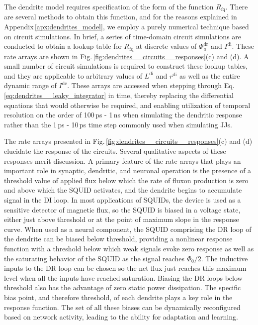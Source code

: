 \documentclass[twocolumn]{article}
\begin{document}
The dendrite model requires specification of the form of the function $R_{\mathrm{fq}}$. There are several methods to obtain this function, and for the reasons explained in Appendix\,\ref{apx:dendrites_model}, we employ a purely numerical technique based on circuit simulations. In brief, a series of time-domain circuit simulations are conducted to obtain a lookup table for $R_{\mathrm{fq}}$ at discrete values of $\Phi^{\mathrm{dr}}_a$ and $I^{\mathrm{di}}$. These rate arrays are shown in Fig.\,\ref{fig:dendrites__circuits__responses}(c) and (d). A small number of circuit simulations is required to construct these lookup tables, and they are applicable to arbitrary values of $L^{\mathrm{di}}$ and $r^{\mathrm{di}}$ as well as the entire dynamic range of $I^{\mathrm{de}}$. These arrays are accessed when stepping through Eq.\,\ref{eq:dendrites__leaky_integrator} in time, thereby replacing the differential equations that would otherwise be required, and enabling utilization of temporal resolution on the order of 100\,ps - 1\,ns when simulating the dendritic response rather than the 1\,ps - 10\,ps time step commonly used when simulating JJs.

The rate arrays presented in Fig.\,\ref{fig:dendrites__circuits__responses}(c) and (d) elucidate the response of the circuits. Several qualitative aspects of these responses merit discussion. A primary feature of the rate arrays that plays an important role in synaptic, dendritic, and neuronal operation is the presence of a threshold value of applied flux below which the rate of fluxon production is zero and above which the SQUID activates, and the dendrite begins to accumulate signal in the DI loop. In most applications of SQUIDs, the device is used as a sensitive detector of magnetic flux, so the SQUID is biased in a voltage state, either just above threshold or at the point of maximum slope in the response curve. When used as a neural component, the SQUID comprising the DR loop of the dendrite can be biased below threshold, providing a nonlinear response function with a threshold below which weak signals evoke zero response as well as the saturating behavior of the SQUID as the signal reaches $\Phi_0/2$. The inductive inputs to the DR loop can be chosen so the net flux just reaches this maximum level when all the inputs have reached saturation. Biasing the DR loops below threshold also has the advantage of zero static power dissipation. The specific bias point, and therefore threshold, of each dendrite plays a key role in the response function. The set of all these biases can be dynamically reconfigured based on network activity, leading to the ability for adaptation and learning.  
\end{document}
